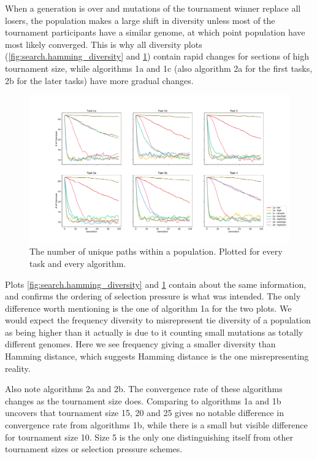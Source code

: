 When a generation is over and mutations of the tournament winner replace all losers, the population makes a large shift in diversity unless most of the tournament participants have a similar genome, at which point population have most likely converged. This is why all diversity plots (\ref{fig:search.hamming_diversity} and \ref{fig:search.frequency_diversity_unique}) contain rapid changes for sections of high tournament size, while algorithms 1a and 1c (also algorithm 2a for the first tasks, 2b for the later tasks) have more gradual changes. 

\begin{figure}
    \includegraphics[width=1.2\textwidth,center]{Chapters/4.Experiments/exp2/figures/large/frequency_diversity_unique_path_count.pdf}
    \caption[Unique genome frequency diversity]{The number of unique paths within a population. Plotted for every task and every algorithm.}
    \label{fig:search.frequency_diversity_unique}
\end{figure}

Plots \ref{fig:search.hamming_diversity} and \ref{fig:search.frequency_diversity_unique} contain about the same information, and confirms the ordering of selection pressure is what was intended. The only difference worth mentioning is the one of algorithm 1a for the two plots. We would expect the frequency diversity to misrepresent tie diversity of a population as being higher than it actually is due to it counting small mutations as totally different genomes. Here we see frequency giving a smaller diversity than Hamming distance, which suggests Hamming distance is the one misrepresenting reality. 

Also note algorithms 2a and 2b. The convergence rate of these algorithms changes as the tournament size does. Comparing to algorithms 1a and 1b uncovers that tournament size 15, 20 and 25 gives no notable difference in convergence rate from algorithms 1b, while there is a small but visible difference for tournament size 10. Size 5 is the only one distinguishing itself from other tournament sizes or selection pressure schemes. 


